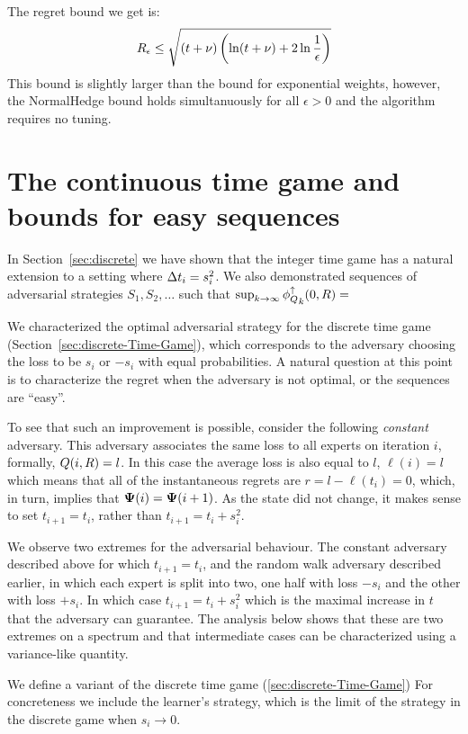 \documentclass{article}[12pt]
\begin{document}
The regret bound we get is:
\begin{equation}
R_\epsilon \leq \sqrt{(t+\nu) \left( \ln (t+\nu) + 2 \ln \frac{1}{\epsilon}\right)}
\end{equation}
This bound is slightly larger than the bound for exponential weights,
however, the NormalHedge bound holds simultanuously for all
$\epsilon>0$ and the algorithm requires no tuning.

\section{The continuous time game and bounds for easy sequences} \label{sec:easy}
In Section~\ref{sec:discrete} we have shown that the integer time game
has a natural extension to a setting where $\Delta t_i = s_i^2$. We
also demonstrated sequences of adversarial strategies
$S_1,S_2,\ldots$ such that $\sup_{k \to \infty} {\phi_{Q}^{\uparrow}}_k(0,R) = $

We characterized the optimal adversarial strategy for the discrete
time game (Section~\ref{sec:discrete-Time-Game}), which corresponds
to the adversary choosing the loss to be $s_i$ or $-s_i$ with equal
probabilities. A natural question at this point is to characterize the
regret when the adversary is not optimal, or the sequences are ``easy''.

To see that such an improvement is possible, consider the following
{\em constant} adversary. This adversary associates the same loss to
all experts on iteration $i$, formally, $Q(i,R) = l$. In this
case the average loss is also equal to $l$, $\ell(i)=l$ which means
that all of the instantaneous regrets are $r=l-\ell(t_i) = 0$, which,
in turn, implies that ${\bf \Psi}(i) = {\bf \Psi}(i+1)$. As the state did not
change, it makes sense to set $t_{i+1}=t_i$, rather than
$t_{i+1}=t_i+s_i^2$.

We observe two extremes for the adversarial behaviour. The constant
adversary described above for which $t_{i+1} = t_i$, and the random walk adversary described
earlier, in which each expert is split into two, one half with loss
$-s_i$ and the other with loss $+s_i$. In which case $t_{i+1} =
t_i+s_i^2$ which is the maximal increase in $t$ that the adversary can
guarantee. The analysis below shows that these are two extremes on a
spectrum and that intermediate cases can be characterized using a
variance-like quantity.

We define a variant of the discrete time game
(\ref{sec:discrete-Time-Game}) For concreteness we include the
learner's strategy, which is the limit of the strategy in the discrete
game when $s_i \to 0$.
\end{document}
